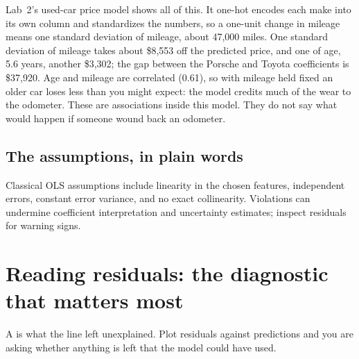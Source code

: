 Lab~2's used-car price model shows all of this. It one-hot encodes each make into its own column and standardizes the numbers, so a one-unit change in mileage means one standard deviation of mileage, about 47,000 miles. One standard deviation of mileage takes about \$8,553 off the predicted price, and one of age, 5.6 years, another \$3,302; the gap between the Porsche and Toyota coefficients is \$37,920. Age and mileage are correlated (0.61), so with mileage held fixed an older car loses less than you might expect: the model credits much of the wear to the odometer. These are associations inside this model. They do not say what would happen if someone wound back an odometer.

\subsection{The assumptions, in plain words}

Classical OLS assumptions include linearity in the chosen features, independent errors, constant error variance, and no exact collinearity. Violations can undermine coefficient interpretation and uncertainty estimates; inspect residuals for warning signs.

\section{Reading residuals: the diagnostic that matters most}

A  is what the line left unexplained. Plot residuals against predictions and you are asking whether anything is left that the model could have used.

